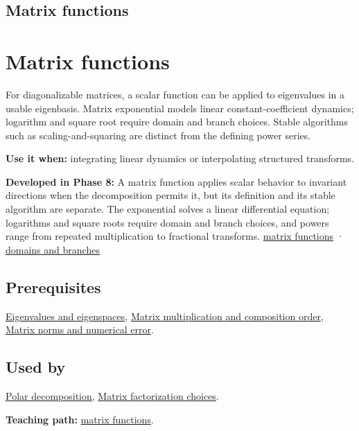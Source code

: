 \hypertarget{appendix-0f4bc2bf2b1f}{}
\section*{Matrix functions}
\chapter{Matrix functions}\label{appendix-0f4bc2bf2b1f-matrix-functions}

For diagonalizable matrices, a scalar function can be applied to eigenvalues in a usable eigenbasis. Matrix exponential models linear constant-coefficient dynamics; logarithm and square root require domain and branch choices. Stable algorithms such as scaling-and-squaring are distinct from the defining power series.

\textbf{Use it when:} integrating linear dynamics or interpolating structured transforms.

\textbf{Developed in Phase 8:} A matrix function applies scalar behavior to invariant directions when the decomposition permits it, but its definition and its stable algorithm are separate. The exponential solves a linear differential equation; logarithms and square roots require domain and branch choices, and powers range from repeated multiplication to fractional transforms. \href{Continuous\%20Notes/Computing\%20Foundations\%20-\%20From\%20Bits\%20to\%20C++\%20and\%20Systems\%20APIs\#Matrix\%20functions\%20turn\%20repeated\%20linear\%20actions\%20into\%20one\%20operator}{matrix functions} · \href{Continuous\%20Notes/Computing\%20Foundations\%20-\%20From\%20Bits\%20to\%20C++\%20and\%20Systems\%20APIs\#Logarithms\%20and\%20square\%20roots\%20need\%20domains\%20and\%20branches}{domains and branches}

\section{Prerequisites}\label{appendix-0f4bc2bf2b1f-prerequisites}

\hyperref[appendix-0b3be18411f9]{Eigenvalues and eigenspaces}, \hyperref[appendix-ab31ef447dbf]{Matrix multiplication and composition order}, \hyperref[appendix-f8657bac66e5]{Matrix norms and numerical error}.

\section{Used by}\label{appendix-0f4bc2bf2b1f-used-by}

\hyperref[appendix-73f5bcf7a462]{Polar decomposition}, \hyperref[appendix-221a483bec2d]{Matrix factorization choices}.

\textbf{Teaching path:} \href{Continuous\%20Notes/Computing\%20Foundations\%20-\%20From\%20Bits\%20to\%20C++\%20and\%20Systems\%20APIs\#Matrix\%20functions\%20turn\%20repeated\%20linear\%20actions\%20into\%20one\%20operator}{matrix functions}.
